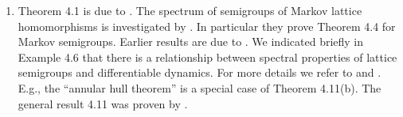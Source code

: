 \begin{enumerate}[label=\emph{Section \arabic*:}, wide]
\item
Theorem 4.1 is due to \citet{derndinger:1984}.
The spectrum of semigroups of Markov lattice homomorphisms is investigated by \citet{derndingernagel:1979}.
In particular they prove Theorem 4.4 for Markov semigroups.
Earlier results are due to \citet{scarpellini:1974}.
We indicated briefly in Example 4.6 that there is a relationship between spectral properties of lattice semigroups and differentiable dynamics.
For more details we refer to \citet{chiconeswanson:1981} and \citet{sackersell:1978}.
E.g., the \enquote{annular hull theorem} is a special case of Theorem 4.11(b).
The general result 4.11 was proven by \citet{arendtgreiner:1984}.

\end{enumerate}
